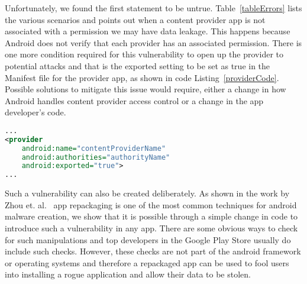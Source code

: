 \noindent
Unfortunately, we found the first statement to be untrue. Table~\ref{tableErrors} lists the various scenarios and points out when a content provider app is not associated with a permission we may have data leakage. This happens because Android does not verify that each provider has an associated permission. There is one more condition required for this vulnerability to open up the provider to potential attacks and that is the exported setting to be set as true in the Manifest file for the provider app, as shown in code Listing~\ref{providerCode}. Possible solutions to mitigate this issue would require, either a change in how Android handles content provider access control or a change in the app developer's code.

\begin{lstlisting}[caption={Provider exported tag set as true},label={providerCode},language=XML]
...
<provider
	android:name="contentProviderName"
	android:authorities="authorityName"
	android:exported="true">
...
\end{lstlisting}

Such a vulnerability can also be created deliberately. As shown in the work by Zhou et. al.~\cite{Zhou2012MalwareGenomeProject} app repackaging is one of the most common techniques for android malware creation, we show that it is possible through a simple change in code to introduce such a vulnerability in any app. There are some obvious ways to check for such manipulations and top developers in the Google Play Store usually do include such checks. However, these checks are not part of the android framework or operating systems and therefore a repackaged app can be used to fool users into installing a rogue application and allow their data to be stolen.
